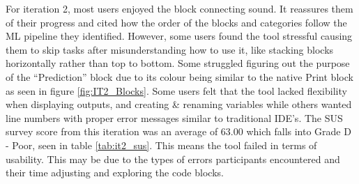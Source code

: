 \documentclass{sigchi-ext}
\begin{document}
For iteration 2, most users enjoyed the block connecting sound. It reassures them of their progress and cited how the order of the blocks and categories follow the ML pipeline they identified. However, some users found the tool stressful causing them to skip tasks after misunderstanding how to use it, like stacking blocks horizontally rather than top to bottom. Some struggled figuring out the purpose of the ``Prediction'' block due to its colour being similar to the native Print block as seen in figure \ref{fig:IT2_Blocks}. Some users felt that the tool lacked flexibility when displaying outputs, and creating \& renaming variables while others wanted line numbers with proper error messages similar to traditional IDE's. The SUS survey score from this iteration was an average of 63.00 which falls into Grade D - Poor, seen in table \ref{tab:it2_sus}. This means the tool failed in terms of usability. This may be due to the types of errors participants encountered and their time adjusting and exploring the code blocks. 
\end{document}
